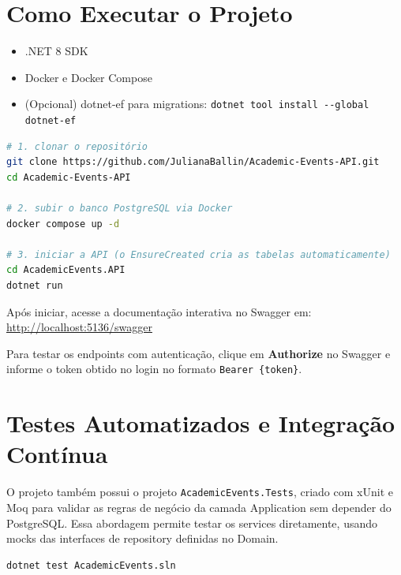 \documentclass[11pt, a4paper, oneside]{article}
\begin{document}
\section{Como Executar o Projeto}

\begin{tcolorbox}[destaque, title={Requisitos}]
\begin{itemize}[noitemsep]
  \item .NET 8 SDK
  \item Docker e Docker Compose
  \item (Opcional) dotnet-ef para migrations: \texttt{dotnet tool install -{}-global dotnet-ef}
\end{itemize}
\end{tcolorbox}

\begin{lstlisting}[language=bash]
# 1. clonar o repositório
git clone https://github.com/JulianaBallin/Academic-Events-API.git
cd Academic-Events-API

# 2. subir o banco PostgreSQL via Docker
docker compose up -d

# 3. iniciar a API (o EnsureCreated cria as tabelas automaticamente)
cd AcademicEvents.API
dotnet run
\end{lstlisting}

Após iniciar, acesse a documentação interativa no Swagger em: \url{http://localhost:5136/swagger}

Para testar os endpoints com autenticação, clique em \textbf{Authorize} no Swagger e informe o token obtido no login no formato \texttt{Bearer \{token\}}.

\section{Testes Automatizados e Integração Contínua}

O projeto também possui o projeto \texttt{AcademicEvents.Tests}, criado com xUnit e Moq para validar as regras de negócio da camada Application sem depender do PostgreSQL. Essa abordagem permite testar os services diretamente, usando mocks das interfaces de repository definidas no Domain.

\begin{lstlisting}[language=bash]
dotnet test AcademicEvents.sln
\end{lstlisting}
\end{document}
